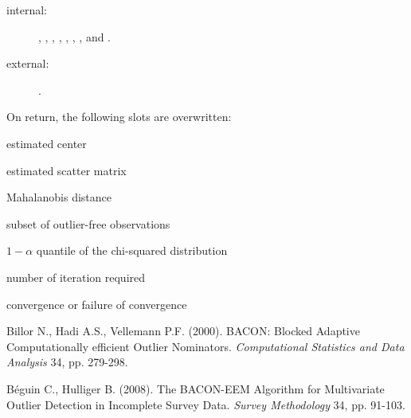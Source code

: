 \documentclass[a4paper,oneside,10pt,DIV=12]{scrartcl}
\begin{document}
\begin{Dependencies}
	\begin{description}
		\item[internal:]
		,
		,
		,
		,
		,
		,
		, and
		.
		\item[external:]
		.
	\end{description}
\end{Dependencies}
\begin{Value}
On return, the following slots are overwritten:
	\begin{ldescription}
		\item[\code{center}] estimated center
		\item[\code{scatter}] estimated scatter matrix
		\item[\code{dist}] Mahalanobis distance
		\item[\code{subset0}] subset of outlier-free observations
		\item[\code{cutoff}] $1-\alpha$ quantile of the chi-squared
			distribution
		\item[\code{maxiter}] number of iteration required
		\item[\code{success}] convergence or failure of convergence
	\end{ldescription}
\end{Value}

\begin{References}
Billor N., Hadi A.S., Vellemann P.F. (2000). BACON: Blocked Adaptive
Computationally efficient Outlier Nominators. \textit{Computational Statistics
and Data Analysis} 34, pp. 279-298.

B{\'e}guin C., Hulliger B. (2008). The BACON-EEM Algorithm for Multivariate
Outlier Detection in Incomplete Survey Data. \textit{Survey Methodology} 34,
pp. 91-103.
\end{References}
\end{document}
